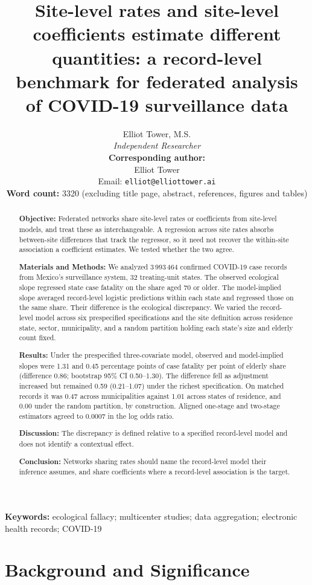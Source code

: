 \documentclass[11pt]{article}
\title{Site-level rates and site-level coefficients estimate different\\
quantities: a record-level benchmark for federated analysis\\
of COVID-19 surveillance data}
\author{Elliot Tower, M.S.\\
\textit{Independent Researcher}\\[6pt]
\textbf{Corresponding author:}\\
Elliot Tower\\
Email: \texttt{elliot@elliottower.ai}\\
\corrcontact
\textbf{Word count:} 3320 (excluding title page, abstract, references,
figures and tables)}
\date{}
\begin{document}
\maketitle

\begin{abstract}
\noindent\textbf{Objective:}
Federated networks share site-level rates or coefficients from
site-level models, and treat these as interchangeable.  A regression
across site rates absorbs between-site differences that track the
regressor, so it need not recover the within-site association a
coefficient estimates.  We tested whether the two agree.

\noindent\textbf{Materials and Methods:}
We analyzed 3\,993\,464 confirmed COVID-19 case records from Mexico's
surveillance system, 32 treating-unit states.  The observed
ecological slope regressed state case fatality on the share aged 70 or
older.  The model-implied slope averaged record-level logistic
predictions within each state and regressed those on the same share.  Their difference is the
ecological discrepancy.  We varied the
record-level model across six prespecified specifications and the
site definition across residence state, sector, municipality, and a
random partition holding each state's size and elderly count fixed.

\noindent\textbf{Results:}
Under the prespecified three-covariate model, observed and
model-implied slopes were 1.31 and 0.45 percentage points of case
fatality per point of elderly share (difference 0.86; bootstrap 95\% CI
0.50--1.30).  The difference fell as adjustment increased but remained
0.59 (0.21--1.07) under the richest specification.  On matched records it
was 0.47 across municipalities against 1.01 across states of
residence, and 0.00 under the random partition, by construction.  Aligned one-stage and two-stage estimators
agreed to 0.0007 in the log odds ratio.

\noindent\textbf{Discussion:}
The discrepancy is defined relative to a specified record-level model
and does not identify a contextual effect.

\noindent\textbf{Conclusion:}
Networks sharing rates should name the record-level model their inference
assumes, and share coefficients where a record-level
association is the target.
\end{abstract}

\noindent\textbf{Keywords:} ecological fallacy; multicenter studies; data aggregation;
electronic health records; COVID-19


\section{Background and Significance}
\end{document}

